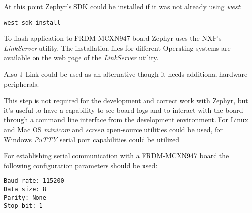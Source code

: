 \documentclass[twoside, 12pt]{article}
\begin{document}
At this point Zephyr's SDK could be installed if it was not already using \textit{west}: 
\begin{lstlisting}[caption=Installing Zephyr SDK using West]
west sdk install
\end{lstlisting}\label{west_sdk_install}

To flash application to FRDM-MCXN947 board Zephyr uses the NXP's \textit{LinkServer} utility.
The installation files for different Operating systems are available on the web page of the \textit{LinkServer} utility.\cite{link_server}

Also J-Link could be used as an alternative though it needs additional hardware peripherals.  \cite{zephyr_mcxn947}

This step is not required for the development and correct work with Zephyr, but it's useful 
to have a capability to see board logs and to interact with the board through a command line 
interface from the development environment. For Linux and Mac OS \textit{minicom}\cite{jayantilal_hc05} and 
\textit{screen}\cite{gnu_screen} open-source utilities could be used, for Windows \textit{PuTTY} serial port 
capabilities could be utilized. 

For establishing serial communication with a FRDM-MCXN947 board the following configuration parameters should be used\cite{mcxn947_getting_started}:
\begin{lstlisting}[caption=Serial port configuration]
Baud rate: 115200
Data size: 8
Parity: None
Stop bit: 1
\end{lstlisting}
\end{document}
